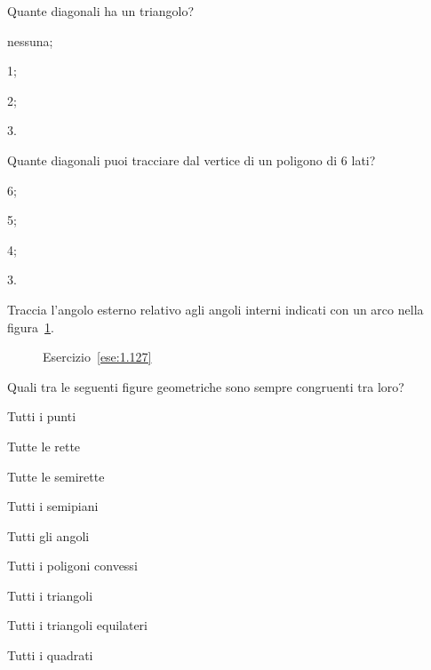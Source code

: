 \begin{esercizio}
\label{ese:1.125}
Quante diagonali ha un triangolo?
\begin{multicols}{4}
\begin{enumeratea}
\item nessuna;
\item 1;
\item 2;
\item 3.
\end{enumeratea}
\end{multicols}
\end{esercizio}

\begin{esercizio}
\label{ese:1.126}
Quante diagonali puoi tracciare dal vertice di un poligono di 6 lati?
\begin{multicols}{4}
\begin{enumeratea}
\item 6;
\item 5;
\item 4;
\item 3.
\end{enumeratea}
\end{multicols}
\end{esercizio}

\begin{esercizio}
\label{ese:1.127}
Traccia l'angolo esterno relativo agli angoli interni indicati con un 
arco nella figura~\ref{fig:ese1.127}.
\end{esercizio}


\begin{inaccessibleblock}
 \begin{figure}[htb]
 \centering
 \caption{Esercizio~\ref{ese:1.127}}\label{fig:ese1.127}
\end{figure}
\end{inaccessibleblock}

\begin{esercizio}
\label{ese:1.128}
Quali tra le seguenti figure geometriche sono sempre congruenti tra 
loro?
\begin{multicols}{2}
\begin{enumeratea}
\item Tutti i punti				
\tab\tab\boxV\quad\boxF
\item Tutte le rette				
\tab\tab\boxV\quad\boxF
\item Tutte le semirette				
\tab\boxV\quad\boxF
\item Tutti i semipiani				\tab\boxV\quad\boxF
\item Tutti gli angoli			\tab\tab\boxV\quad\boxF
\item Tutti i poligoni convessi		\tab\boxV\quad\boxF
\item Tutti i triangoli			\tab\tab\boxV\quad\boxF
\item Tutti i triangoli equilateri	\tab\boxV\quad\boxF
\item Tutti i quadrati			\tab\tab\boxV\quad\boxF
\end{enumeratea}
\end{multicols}
\end{esercizio}

